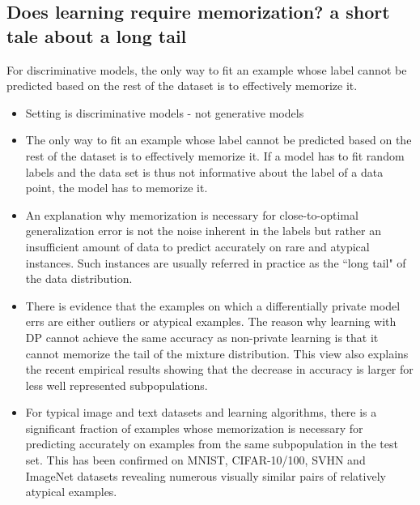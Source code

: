 \documentclass{article}
\begin{document}
\subsection{Does learning require memorization? a short tale about a long tail}
\begin{tldr}
    For discriminative models, the only way to fit an example whose label cannot be predicted based on the rest of the dataset is to effectively memorize it.
\end{tldr}
\begin{itemize}
    \item Setting is discriminative models - not generative models
    \item The only way to fit an example whose label cannot be predicted based on the rest of the dataset is to effectively memorize it. If a model has to fit random labels and the data set is thus not informative about the label of a data point, the model has to memorize it.
    \item An explanation why memorization is necessary for close-to-optimal generalization error is not the noise inherent in the labels but rather an insufficient amount of data to predict accurately on rare and atypical instances. Such instances are usually referred in practice as the “long tail" of the data distribution.
    \item There is evidence that the examples on which a differentially private model errs are either outliers or atypical examples. The reason why learning with DP cannot achieve the same accuracy as non-private learning is that it cannot memorize the tail of the mixture distribution. This view also explains the recent empirical results showing that the decrease in accuracy is larger for less well represented subpopulations.
    \item For typical image and text datasets and learning algorithms, there is a significant fraction of examples whose memorization is necessary for predicting accurately on examples from the same subpopulation in the test set. This has been confirmed on MNIST, CIFAR-10/100, SVHN and ImageNet datasets revealing numerous visually similar pairs of relatively atypical examples.
\end{itemize}
\end{document}
